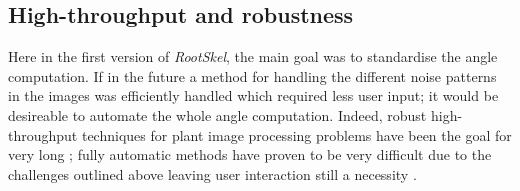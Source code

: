%
%
%


\subsection{High-throughput and robustness}

Here in the first version of \textit{RootSkel}, the main goal was to standardise the angle computation. If in the future  a method for handling the different noise patterns in the images was efficiently handled which required less user input; it would be desireable to automate the whole angle computation. Indeed, robust high-throughput techniques for plant image processing problems have been the goal for very long \cite{hartmann2011htpheno,diener2013automated,lee2018automated,plantCV}; fully automatic methods have proven to be very difficult due to the challenges outlined above leaving user interaction still a necessity \cite{pound2013rootnav}.

